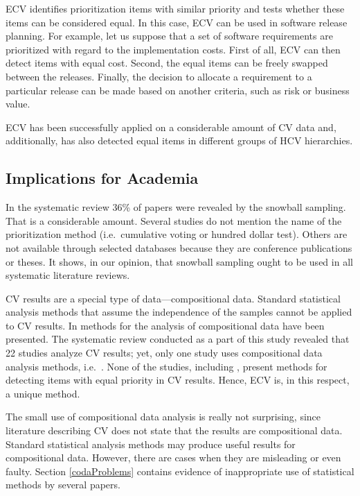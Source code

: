 ECV identifies prioritization items with similar priority and tests whether these items can be considered equal.
In this case, ECV can be used in software release planning.
For example, let us suppose that a set of software requirements are prioritized with regard to the implementation costs.
First of all, ECV can then detect items with equal cost.
Second, the equal items can be freely swapped between the releases.
Finally, the decision to allocate a requirement to a particular release can be made based on another criteria, such as risk or business value.

ECV has been successfully applied on a considerable amount of CV data and, additionally, has also detected equal items in different groups of HCV hierarchies.

\subsection{Implications for Academia}
In the systematic review 36\% of papers were revealed by the snowball sampling.
That is a considerable amount.
Several studies do not mention the name of the prioritization method (i.e.\ cumulative voting or hundred dollar test).
Others are not available through selected databases because they are conference publications or theses.
It shows, in our opinion, that snowball sampling ought to be used in all systematic literature reviews.

CV results are a special type of data---compositional data.
Standard statistical analysis methods that assume the independence of the samples cannot be applied to CV results.
In \citep{Aitchison1986} methods for the analysis of compositional data have been presented.
The systematic review conducted as a part of this study revealed that 22 studies analyze CV results; yet, only one study uses compositional data analysis methods, i.e.\ \citep{Chatzipetrou2010}.
None of the studies, including \citep{Chatzipetrou2010}, present methods for detecting items with equal priority in CV results. Hence, ECV is, in this respect, a unique method.

The small use of compositional data analysis is really not surprising, since literature describing CV does not state that the results are compositional data.
Standard statistical analysis methods may produce useful results for compositional data.
However, there are cases when they are misleading or even faulty.
Section \ref{codaProblems} contains evidence of inappropriate use of statistical methods by several papers.


